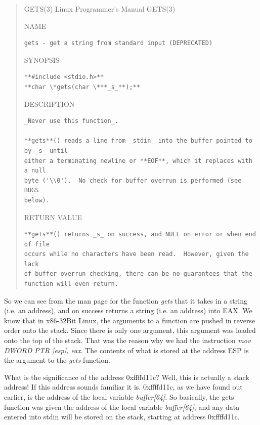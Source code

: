 \begin{quote}
GETS(3)                   Linux Programmer's Manual                  GETS(3)

NAME

\begin{verbatim}
gets - get a string from standard input (DEPRECATED)
\end{verbatim}

SYNOPSIS

\begin{verbatim}
**#include <stdio.h>**
**char \*gets(char \***_s_**);**
\end{verbatim}

DESCRIPTION

\begin{verbatim}
_Never use this function_.

**gets**() reads a line from _stdin_ into the buffer pointed to by _s_ until
either a terminating newline or **EOF**, which it replaces with a null
byte ('\\0').  No check for buffer overrun is performed (see BUGS
below).
\end{verbatim}

RETURN VALUE

\begin{verbatim}
**gets**() returns _s_ on success, and NULL on error or when end of file
occurs while no characters have been read.  However, given the lack
of buffer overrun checking, there can be no guarantees that the
function will even return.
\end{verbatim}
\end{quote}

So we can see from the man page for the function \textit{gets} that it takes in a string (i.e. an address), and on success returns a string (i.e. an address) into EAX. We know that in x86-32Bit Linux, the arguments to a function are pushed in reverse order onto the stack. Since there is only one argument, this argument was loaded onto the top of the stack. That was the reason why we had the instruction \textit{mov DWORD PTR [esp], eax}. The contents of what is stored at the address ESP is the argument to the \textit{gets} function.

What is the significance of the address 0xffffd11c? Well, this is actually a stack address! If this address sounds familiar it is. 0xffffd11c, as we have found out earlier, is the address of the local variable \textit{buffer[64]}. So basically, the gets function was given the address of the local variable \textit{buffer[64]}, and any data entered into stdin will be stored on the stack, starting at address 0xffffd11c.

